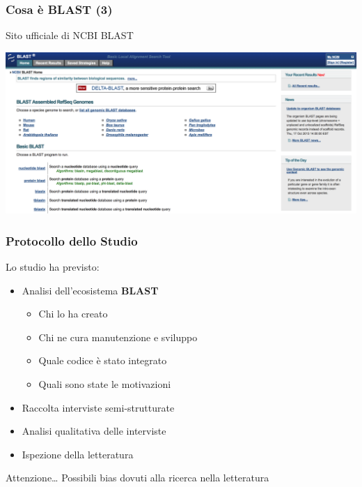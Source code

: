 \begin{frame}\frametitle{Cosa è BLAST (3)}

\begin{center}
\Large{Sito ufficiale di NCBI BLAST}
\end{center}

\begin{center}
    \includegraphics[scale=.12]{img/ncbi_blast}
\end{center}

\end{frame}

\begin{frame}\frametitle{Protocollo dello Studio}

\Large{Lo studio ha previsto:}

\begin{itemize}[<+->]
\itemsep1pt\parskip0pt
\item
  Analisi dell'ecosistema \alert{\textbf{BLAST}}

  \begin{itemize}[<+->]
  \itemsep1pt\parskip0pt
  \item
    Chi lo ha creato
  \item
    Chi ne cura manutenzione e sviluppo
  \item
    Quale codice è stato integrato
  \item
    Quali sono state le motivazioni
  \end{itemize}
\item
  Raccolta interviste semi-strutturate
\item
  Analisi qualitativa delle interviste
\item
  Ispezione della letteratura
\end{itemize}

\begin{alertblock}{Attenzione\dots}
Possibili bias dovuti alla ricerca nella letteratura
\end{alertblock}

\end{frame}

